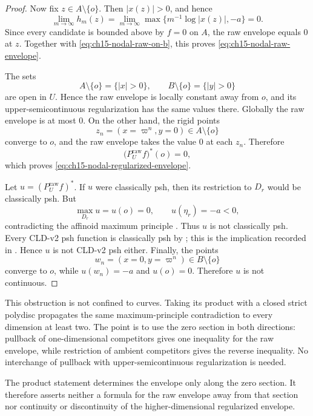 \begin{proof}
Now fix $z\in A\setminus\{o\}$.  Then $|x(z)|>0$, and hence
\[
 \lim_{m\to\infty}h_m(z)
 =\lim_{m\to\infty}
       \max\{m^{-1}\log|x(z)|,-a\}
 =0.
\]
Since every candidate is bounded above by $f=0$ on $A$, the raw
envelope equals $0$ at $z$.  Together with
\eqref{eq:ch15-nodal-raw-on-b}, this proves
\eqref{eq:ch15-nodal-raw-envelope}.

The sets
\[
 A\setminus\{o\}=\{|x|>0\},
 \qquad
 B\setminus\{o\}=\{|y|>0\}
\]
are open in $U$.  Hence the raw envelope is locally constant away from
$o$, and its upper-semicontinuous regularization has the same values
there.  Globally the raw envelope is at most $0$.  On the other hand, the
rigid points
\[
                  z_n=(x=\varpi^n,y=0)\in A\setminus\{o\}
\]
converge to $o$, and the raw envelope takes the value $0$ at each
$z_n$.  Therefore
\[
                 \bigl(P_U^{\mathrm{raw}}f\bigr)^*(o)=0,
\]
which proves \eqref{eq:ch15-nodal-regularized-envelope}.

Let $u=(P_U^{\mathrm{raw}}f)^*$.  If $u$ were classically psh, then its
restriction to $D_r$ would be classically psh.  But
\[
                 \max_{D_r}u=u(o)=0,
 \qquad
                 u(\eta_r)=-a<0,
\]
contradicting the affinoid maximum principle
\cite[Theorem~6.4]{GR25Classical}.  Thus $u$ is not classically psh.
Every CLD-v2 psh function is classically psh by
; this is the implication recorded in
\cite[\S1.2]{GR25Classical}.  Hence $u$ is not CLD-v2 psh either.
Finally, the points
\[
                  w_n=(x=0,y=\varpi^n)\in B\setminus\{o\}
\]
converge to $o$, while $u(w_n)=-a$ and $u(o)=0$.  Therefore $u$ is
not continuous.
\end{proof}

This obstruction is not confined to curves.  Taking its product with a
closed strict polydisc propagates the same maximum-principle contradiction
to every dimension at least two.  The point is to use the zero section in
both directions: pullback of one-dimensional competitors gives one
inequality for the raw envelope, while restriction of ambient competitors
gives the reverse inequality.  No interchange of pullback with
upper-semicontinuous regularization is needed.




The product statement determines the envelope only along the zero section.
It therefore asserts neither a formula for the raw envelope away from that
section nor continuity or discontinuity of the higher-dimensional
regularized envelope.

